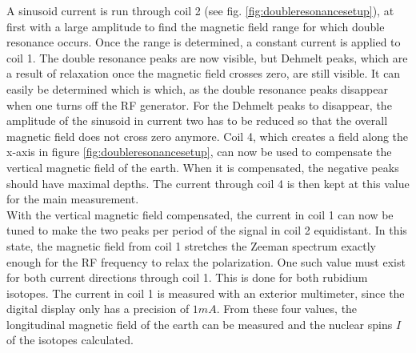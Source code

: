 A sinusoid current is run through coil 2 (see fig. \ref{fig:doubleresonancesetup}), at first with a large amplitude to find the magnetic field range for which double resonance occurs. Once the range is determined, a constant current is applied to coil 1. The double resonance peaks are now visible, but Dehmelt peaks, which are a result of relaxation once the magnetic field crosses zero, are still visible. It can easily be determined which is which, as the double resonance peaks disappear when one turns off the RF generator. For the Dehmelt peaks to disappear, the amplitude of the sinusoid in current two has to be reduced so that the overall magnetic field does not cross zero anymore.  Coil 4, which creates a field along the x-axis in figure \ref{fig:doubleresonancesetup}, can now be used to compensate the vertical magnetic field of the earth. When it is compensated, the negative peaks should have maximal depths. The current through coil 4 is then kept at this value for the main measurement.\\
With the vertical magnetic field compensated, the current in coil 1 can now be tuned to make the two peaks per period of the signal in coil 2 equidistant. In this state, the magnetic field from coil 1 stretches the Zeeman spectrum exactly enough for the RF frequency to relax the polarization. One such value must exist for both current directions through coil 1. This is done for both rubidium isotopes. The current in coil 1 is measured with an exterior multimeter, since the digital display only has a precision of $\unit{1}{mA}$. From these four values, the longitudinal magnetic field of the earth can be measured and the nuclear spins $I$ of the isotopes calculated.

